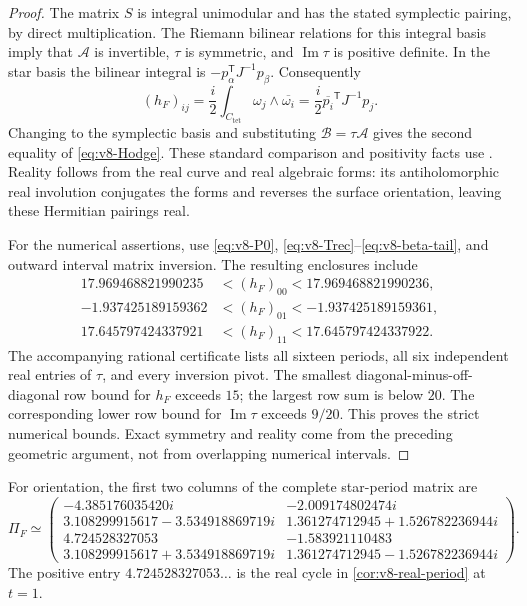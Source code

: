 \documentclass[11pt]{article}
\theoremstyle{definition}
\theoremstyle{remark}
\begin{document}
\begin{proof}
The matrix $S$ is integral unimodular and has the stated symplectic pairing,
by direct multiplication. The Riemann bilinear relations for this integral
basis imply that $\mathcal A$ is invertible, $\tau$ is symmetric, and
$\operatorname{Im}\tau$ is positive definite. In the star basis the
bilinear integral is $-p_\alpha^{\mathsf T}J^{-1}p_\beta$. Consequently
\[
 (h_F)_{ij}=\frac i2\int_{C_{\mathrm{tet}}}
            \omega_j\wedge\overline{\omega_i}
          =\frac i2\overline{p_i}^{\mathsf T}J^{-1}p_j.
\]
Changing to the symplectic basis and substituting
$\mathcal B=\tau\mathcal A$ gives the second equality of
\eqref{eq:v8-Hodge}. These standard comparison and positivity facts use
\cite{MilneAV}. Reality follows from the real curve and real algebraic
forms: its antiholomorphic real involution conjugates the forms and reverses
the surface orientation, leaving these Hermitian pairings real.

For the numerical assertions, use \eqref{eq:v8-P0},
\eqref{eq:v8-Trec}--\eqref{eq:v8-beta-tail}, and outward interval matrix
inversion. The resulting enclosures include
\[
 \begin{split}
 17.969468821990235&<(h_F)_{00}<17.969468821990236,\\
 -1.937425189159362&<(h_F)_{01}<-1.937425189159361,\\
 17.645797424337921&<(h_F)_{11}<17.645797424337922.
 \end{split}
\]
The accompanying rational certificate lists all sixteen periods, all six
independent real entries of $\tau$, and every inversion pivot. The smallest
diagonal-minus-off-diagonal row bound for $h_F$ exceeds $15$; the largest
row sum is below $20$. The corresponding lower row bound for
$\operatorname{Im}\tau$ exceeds $9/20$. This proves the strict numerical
bounds. Exact symmetry and reality come from the preceding geometric
argument, not from overlapping numerical intervals.
\end{proof}

For orientation, the first two columns of the complete star-period matrix are
\begin{equation}
 \Pi_F\simeq\begin{pmatrix}
 -4.385176035420i&-2.009174802474i\\
 3.108299915617-3.534918869719i&1.361274712945+1.526782236944i\\
 4.724528327053&-1.583921110483\\
 3.108299915617+3.534918869719i&1.361274712945-1.526782236944i
 \end{pmatrix}.
 \label{eq:v8-hol-periods}
\end{equation}
The positive entry $4.724528327053\ldots$ is the real cycle in
\cref{cor:v8-real-period} at $t=1$.
\end{document}
